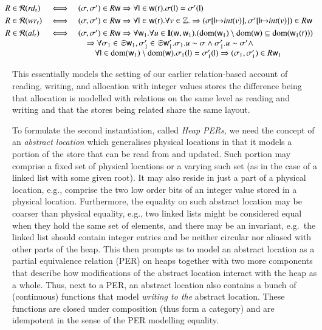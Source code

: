 \documentclass[orivec]{llncs}
\makeatletter
\newif\iffull\fullfalse
\renewcommand\subsection{\@startsection{subsection}{2}{\z@}{-2\p@ \@plus -4\p@ \@minus -4\p@}{-0.5em \@plus -0.22em \@minus -0.1em}{\normalfont\normalsize\bfseries}}
\newcommand{\intt}[1]{\textit{int}(#1)}
\newcommand{\dom}[1]{\mathrm{dom}({#1})}
\newcommand{\regid}{\ensuremath{\mathsf{r}}}
\newcommand{\aEff}[1]{\ensuremath{\mathit{al}_{#1}}}
\newcommand{\rEff}[1]{\ensuremath{\mathit{rd}_{#1}}}
\newcommand{\wEff}[1]{\ensuremath{\mathit{wr}_{#1}}}
\newcommand{\cloc}{\ensuremath{\mathsf{l}}\xspace}
\newcommand\w{\ensuremath{\mathsf{w}}\xspace}
\newcommand{\Astores}{\mathfrak{S}}
\makeatother
\begin{document}
\(
\hspace{-5mm}
 \begin{array}{lcl}
R\in\mathcal{R}(\rEff{\regid})&\iff& (\sigma,\sigma')\in R\w \Rightarrow
\forall \cloc\in \w(\regid). \sigma(\cloc)=\sigma'(\cloc)
\\[3pt]

R\in\mathcal{R}(\wEff{\regid})&\iff& (\sigma,\sigma')\in R\w \Rightarrow
\forall \cloc\in \w(\regid).\forall v\in\mathbb{Z}.\Rightarrow 
(\sigma[\cloc{\mapsto}\intt{v}],\sigma'[\cloc{\mapsto}\intt{
v}])\in R\w
\\[3pt]

R\in\mathcal{R}(\aEff{\regid})&\iff& (\sigma,\sigma')\in R\w 
\Rightarrow \forall \w_1.\forall u\in\mathbf{I}(\w,\w_1). (\dom
{\w_1}\setminus \dom{\w} \subseteq \dom{\w_1(\regid)}) \\
&& \quad
\Rightarrow \forall \sigma_1\in \Astores \w_1,\sigma_1'\in \Astores \w_1'.
\sigma_1.u\sim \sigma\wedge \sigma_1'.u\sim\sigma'\wedge\\
&& \qquad \forall\cloc\in
\dom{\w_1}\setminus\dom \w.  \sigma_1(\cloc)=\sigma_1'(\cloc) \Rightarrow
(\sigma_1,\sigma_1')\in R \w_1
 \end{array}
\)

\noindent
This essentially models the setting of our earlier relation-based
\fi
account of reading, writing, and allocation with integer values stores
\cite{DBLP:conf/ppdp/BentonKBH09} the difference being that allocation
is modelled with relations on the same level as reading and writing
and that the stores being related share the same layout. 
\fi

\subsection{Abstract locations}
To formulate the \iffull third \else second \fi instantiation, called
\emph{Heap PERs}, we need the concept of an \emph{abstract location}
which generalises physical locations in that it models a portion of
the store that can be read from and updated. Such portion may comprise
a fixed set of physical locations or a varying such set (as in the
case of a linked list with some given root). It may also reside in
just a part of a physical location, e.g., comprise the two low order
bits of an integer value stored in a physical location. Furthermore,
the equality on such abstract location may be coarser than physical
equality, e.g., two linked lists might be considered equal when they
hold the same set of elements, and there may be an invariant, e.g.\
the linked list should contain integer entries and be neither circular
nor aliased with other parts of the heap. This then prompts us to
model an abstract location as a partial equivalence relation (PER) on
heaps together with two more components that describe how
modifications of the abstract location interact with the heap as a
whole. Thus, next to a PER, an abstract location also contains a bunch
of (continuous) functions that model \emph{writing to the} abstract
location. These functions are closed under composition (thus form a
category) and are idempotent in the sense of the PER modelling
equality.
\end{document}

